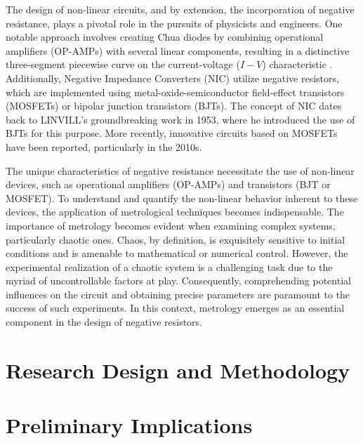 \documentclass[12pt]{article}
\begin{document}
The design of non-linear circuits, and by extension, the incorporation of negative resistance, plays a pivotal role in the pursuits of physicists and engineers. One notable approach involves creating Chua diodes by combining operational amplifiers (OP-AMPs) with several linear components, resulting in a distinctive three-segment piecewise curve on the current-voltage ($I-V$) characteristic \cite{chua_circuit}. Additionally, Negative Impedance Converters (NIC) utilize negative resistors, which are implemented using metal-oxide-semiconductor field-effect transistors (MOSFETs) or bipolar junction transistors (BJTs). The concept of NIC dates back to LINVILL's groundbreaking work in 1953, where he introduced the use of BJTs for this purpose. More recently, innovative circuits based on MOSFETs have been reported, particularly in the 2010s.\cite{NIC_BJT,NIC_MOSFET,NIC_MOSFET2}

The unique characteristics of negative resistance necessitate the use of non-linear devices, such as operational amplifiers (OP-AMPs) and transistors (BJT or MOSFET). To understand and quantify the non-linear behavior inherent to these devices, the application of metrological techniques becomes indispensable. The importance of metrology becomes evident when examining complex systems, particularly chaotic ones. Chaos, by definition, is exquisitely sensitive to initial conditions and is amenable to mathematical or numerical control. However, the experimental realization of a chaotic system is a challenging task due to the myriad of uncontrollable factors at play. Consequently, comprehending potential influences on the circuit and obtaining precise parameters are paramount to the success of such experiments. In this context, metrology emerges as an essential component in the design of negative resistors.




\section{Research Design and Methodology}

\noindent{}


\section{Preliminary Implications}
\end{document}
